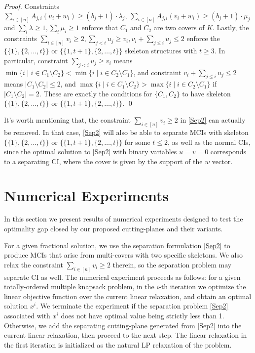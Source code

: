 \begin{proof}
Constraints $\sum_{i \in [n]} A_{j,i} (u_i + w_i) \geq (b_j+1) \cdot \lambda_j, \ \sum_{i \in [n]} A_{j,i} (v_i + w_i) \geq (b_j+1) \cdot \mu_j$ and $\sum_i \lambda \geq 1, \sum_i \mu_i \geq 1$ enforce that $C_1$ and $C_2$ are two covers of $K$. 
Lastly, the constraints $\sum_{i \in [n]} v_i \geq 2, \sum_{j<i} u_j \geq v_i, v_i + \sum_{j \leq i} u_j \leq 2$ enforce the $\{\{1\}, \{2, \ldots, t\}\}$ or $\{\{1,t+1\}, \{2, \ldots, t\}\}$ skeleton structures with $t \geq 3$.
In particular, constraint $\sum_{j<i} u_j \geq v_i$ means $\min\{i \mid i \in C_1 \setminus C_2\} < \min\{i \mid i \in C_2 \setminus C_1\}$, and constraint $v_i + \sum_{j \leq i} u_j \leq 2$ means $|C_1 \setminus C_2| \leq 2$, and $\max\{i \mid i \in C_1 \setminus C_2\} > \max\{i \mid i \in C_2 \setminus C_1\}$ if $|C_1 \setminus C_2| = 2$. These are exactly the conditions for $\{C_1, C_2\}$ to have skeleton $\{\{1\}, \{2, \ldots, t\}\}$ or $\{\{1,t+1\}, \{2, \ldots, t\}\}$. 
\qed \end{proof}

It's worth mentioning that, the constraint $\sum_{i \in [n]} v_i \geq 2$ in \eqref{Sep2} can actually be removed. In that case, \eqref{Sep2} will also be able to separate MCIs with skeleton $\{\{1\}, \{2, \ldots, t\}\}$ or $\{\{1,t+1\}, \{2, \ldots, t\}\}$ for some $t \leq 2$, as well as the normal CIs, since the optimal solution to \eqref{Sep2} with binary variables $u=v=0$ corresponds to a separating CI, where the cover is given by the support of the $w$ vector.



\section{Numerical Experiments}
\label{sec: numerical}

In this section we present results of numerical experiments designed to test the optimality gap closed by our proposed cutting-planes and their variants.

For a given fractional solution, we use the separation formulation \eqref{Sep2} to produce MCIs that arise from multi-covers with two specific skeletons. We also relax the constraint $\sum_{i \in [n]} v_i \geq 2$ therein, so the separation problem may separate CI as well.
The numerical experiment proceeds as follows: for a given totally-ordered multiple knapsack problem, in the $i$-th iteration we optimize the linear objective function over the current linear relaxation, and obtain an optimal solution $x^i$. We terminate the experiment if the separation problem \eqref{Sep2} associated with $x^i$ does not have optimal value being strictly less than 1. Otherwise, we add the separating cutting-plane generated from \eqref{Sep2} into the current linear relaxation, then proceed to the next step. The linear relaxation in the first iteration is initialized as  the natural LP relaxation of the problem. 

